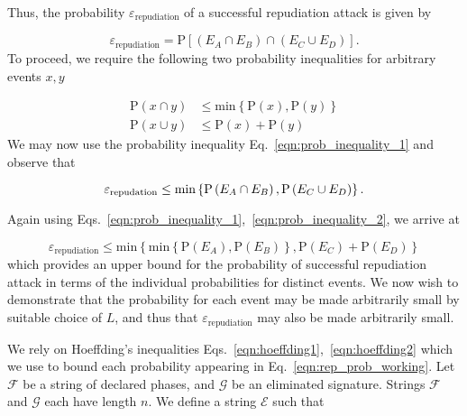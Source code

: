 Thus, the probability $\varepsilon_{\text{repudiation}}$ of a successful repudiation attack is given by

\begin{equation}
\varepsilon_{\text{repudiation}} = \text{P}\left[\left(E_A \cap E_B\right) \cap \left(E_C \cup E_D\right)\right].
\end{equation}
To proceed, we require the following two probability inequalities for arbitrary events $x, y$

\begin{align}
\label{eqn:prob_inequality_1}
\text{P}\left(x \cap y\right) &\le \text{min}\left\{\text{P}\left(x\right), \text{P}\left(y\right)\right\} \\
\label{eqn:prob_inequality_2}
\text{P}\left(x \cup y\right) &\le \text{P}\left(x\right) + \text{P}\left(y\right)
\end{align}
\noindent We may now use the probability inequality Eq.~\ref{eqn:prob_inequality_1} and observe that 

\begin{equation}
\varepsilon_{\text{repudation}} \le \text{min}\left\{\text{P}\left(E_A \cap E_B\right), \text{P}\left(E_C \cup E_D\right)\right\}. \notag
\end{equation}

\noindent Again using Eqs.~\ref{eqn:prob_inequality_1},~\ref{eqn:prob_inequality_2}, we arrive at

\begin{equation}\label{eqn:rep_prob_working}
\varepsilon_{\text{repudiation}} \le \text{min}\left\{
\text{min}\left\{\text{P}\left(E_A\right), \text{P}\left(E_B\right) \right\}, \text{P}\left(E_C\right) + \text{P}\left(E_D\right)\right\}
\end{equation}
which provides an upper bound for the probability of successful repudiation attack in terms of the individual probabilities for distinct events. We now wish to demonstrate that the probability for each event may be made arbitrarily small by suitable choice of $L$, and thus that $\varepsilon_{\text{repudiation}}$ may also be made arbitrarily small.


We rely on Hoeffding's inequalities Eqs.~\ref{eqn:hoeffding1},~\ref{eqn:hoeffding2} which we use to bound each probability appearing in Eq.~\ref{eqn:rep_prob_working}. Let $\mathcal{F}$ be a string of declared phases, and $\mathcal{G}$ be an eliminated signature. Strings $\mathcal{F}$ and $\mathcal{G}$ each have length $n$. We define a string $\mathcal{E}$ such that


